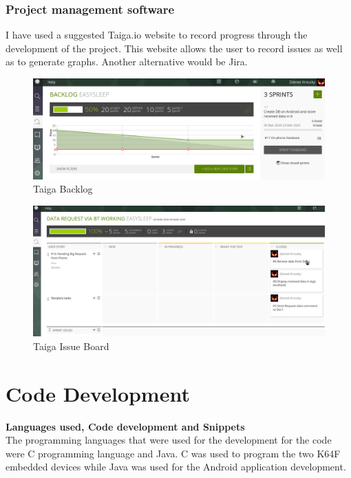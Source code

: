 \documentclass[12pt,a4paper]{article}
\begin{document}
            \subsubsection{Project management software}
            I have used a suggested Taiga.io website to record progress through the development of the project. This website allows the user to record issues as well as to generate graphs. Another alternative would be Jira.
            \begin{figure}[h]
             \centering
             \includegraphics[width=\textwidth]{taiga.png}
             \caption{Taiga Backlog}
             \label{fig:taigaBacklog}
            \end{figure}
            
            \begin{figure}[h]
             \centering
             \includegraphics[width=\textwidth]{taiga1.png}
             \caption{Taiga Issue Board}
             \label{fig:taigaIssuBoard}
            \end{figure}

            \newpage
		
		\section{Code Development}
		{\bfseries Languages used, Code development and Snippets}\\
		
		The programming languages that were used for the development for the code were C programming language and Java. C was used to program the two K64F embedded devices while Java was used for the Android application development.
		
\end{document}

